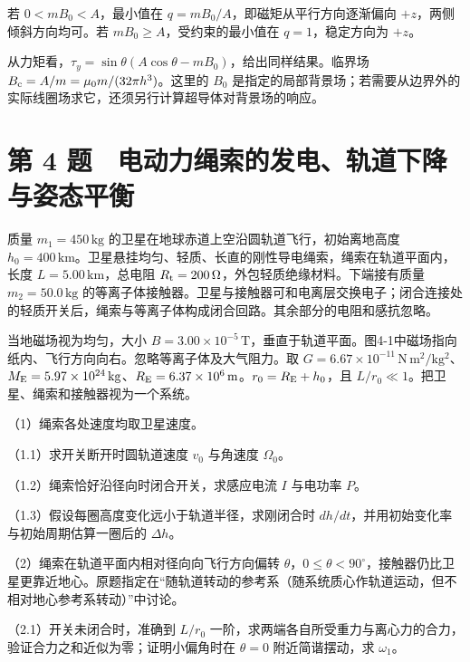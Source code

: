 \documentclass[12pt,a4paper,fontset=fandol]{ctexart}
\begin{document}
若 \(0<mB_0<A\)，最小值在 \(q=mB_0/A\)，即磁矩从平行方向逐渐偏向
\(+z\)，两侧倾斜方向均可。若 \(mB_0\ge A\)，受约束的最小值在
\(q=1\)，稳定方向为 \(+z\)。

从力矩看，\(\tau_y=\sin\theta(A\cos\theta-mB_0)\)，给出同样结果。临界场
\(B_{\rm c}=A/m=\mu_0m/(32\pi h^3)\)。这里的 \(B_0\)
是指定的局部背景场；若需要从边界外的实际线圈场求它，还须另行计算超导体对背景场的响应。

\clearpage

\section{第 4
题　电动力绳索的发电、轨道下降与姿态平衡}\label{ux7b2c-4-ux9898-ux7535ux52a8ux529bux7ef3ux7d22ux7684ux53d1ux7535ux8f68ux9053ux4e0bux964dux4e0eux59ffux6001ux5e73ux8861}

质量 \(m_1=450\,\mathrm{kg}\)
的卫星在地球赤道上空沿圆轨道飞行，初始离地高度
\(h_0=400\,\mathrm{km}\)。卫星悬挂均匀、轻质、长直的刚性导电绳索，绳索在轨道平面内，长度
\(L=5.00\,\mathrm{km}\)，总电阻
\(R_{\rm t}=200\,\Omega\)，外包轻质绝缘材料。下端接有质量
\(m_2=50.0\,\mathrm{kg}\)
的等离子体接触器。卫星与接触器可和电离层交换电子；闭合连接处的轻质开关后，绳索与等离子体构成闭合回路。其余部分的电阻和感抗忽略。

当地磁场视为均匀，大小
\(B=3.00\times10^{-5}\,\mathrm T\)，垂直于轨道平面。图4-1中磁场指向纸内、飞行方向向右。忽略等离子体及大气阻力。取
\(G=6.67\times10^{-11}\,\mathrm{N\,m^2/kg^2}\)、\(M_{\rm E}=5.97\times10^{24}\,\mathrm{kg}\)、\(R_{\rm E}=6.37\times10^6\,\mathrm m\)。\(r_0=R_{\rm E}+h_0\)，且
\(L/r_0\ll1\)。把卫星、绳索和接触器视为一个系统。

（1）绳索各处速度均取卫星速度。

（1.1）求开关断开时圆轨道速度 \(v_0\) 与角速度 \(\Omega_0\)。

（1.2）绳索恰好沿径向时闭合开关，求感应电流 \(I\) 与电功率 \(P\)。

（1.3）假设每圈高度变化远小于轨道半径，求刚闭合时
\(dh/dt\)，并用初始变化率与初始周期估算一圈后的 \(\Delta h\)。

（2）绳索在轨道平面内相对径向向飞行方向偏转
\(\theta\)，\(0\le\theta<90^\circ\)，接触器仍比卫星更靠近地心。原题指定在``随轨道转动的参考系（随系统质心作轨道运动，但不相对地心参考系转动）''中讨论。

（2.1）开关未闭合时，准确到 \(L/r_0\)
一阶，求两端各自所受重力与离心力的合力，验证合力之和近似为零；证明小偏角时在
\(\theta=0\) 附近简谐摆动，求 \(\omega_1\)。
\end{document}
